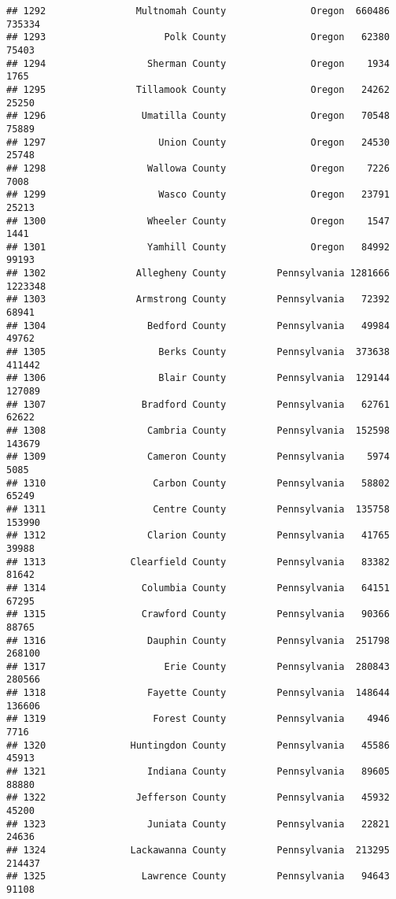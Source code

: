 \documentclass[
]{article}
\begin{document}
\begin{verbatim}
## 1292                Multnomah County               Oregon  660486  735334
## 1293                     Polk County               Oregon   62380   75403
## 1294                  Sherman County               Oregon    1934    1765
## 1295                Tillamook County               Oregon   24262   25250
## 1296                 Umatilla County               Oregon   70548   75889
## 1297                    Union County               Oregon   24530   25748
## 1298                  Wallowa County               Oregon    7226    7008
## 1299                    Wasco County               Oregon   23791   25213
## 1300                  Wheeler County               Oregon    1547    1441
## 1301                  Yamhill County               Oregon   84992   99193
## 1302                Allegheny County         Pennsylvania 1281666 1223348
## 1303                Armstrong County         Pennsylvania   72392   68941
## 1304                  Bedford County         Pennsylvania   49984   49762
## 1305                    Berks County         Pennsylvania  373638  411442
## 1306                    Blair County         Pennsylvania  129144  127089
## 1307                 Bradford County         Pennsylvania   62761   62622
## 1308                  Cambria County         Pennsylvania  152598  143679
## 1309                  Cameron County         Pennsylvania    5974    5085
## 1310                   Carbon County         Pennsylvania   58802   65249
## 1311                   Centre County         Pennsylvania  135758  153990
## 1312                  Clarion County         Pennsylvania   41765   39988
## 1313               Clearfield County         Pennsylvania   83382   81642
## 1314                 Columbia County         Pennsylvania   64151   67295
## 1315                 Crawford County         Pennsylvania   90366   88765
## 1316                  Dauphin County         Pennsylvania  251798  268100
## 1317                     Erie County         Pennsylvania  280843  280566
## 1318                  Fayette County         Pennsylvania  148644  136606
## 1319                   Forest County         Pennsylvania    4946    7716
## 1320               Huntingdon County         Pennsylvania   45586   45913
## 1321                  Indiana County         Pennsylvania   89605   88880
## 1322                Jefferson County         Pennsylvania   45932   45200
## 1323                  Juniata County         Pennsylvania   22821   24636
## 1324               Lackawanna County         Pennsylvania  213295  214437
## 1325                 Lawrence County         Pennsylvania   94643   91108

\end{verbatim}
\end{document}
